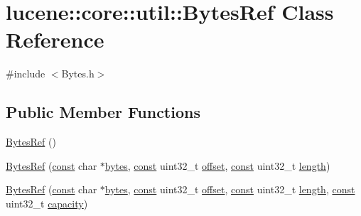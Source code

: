 \hypertarget{classlucene_1_1core_1_1util_1_1BytesRef}{}\section{lucene\+:\+:core\+:\+:util\+:\+:Bytes\+Ref Class Reference}
\label{classlucene_1_1core_1_1util_1_1BytesRef}


{\ttfamily \#include $<$Bytes.\+h$>$}

\subsection*{Public Member Functions}
\begin{DoxyCompactItemize}
\item 
\mbox{\hyperlink{classlucene_1_1core_1_1util_1_1BytesRef_a5c352a399671a6ed5e04cd334149b662}{Bytes\+Ref}} ()
\item 
\mbox{\hyperlink{classlucene_1_1core_1_1util_1_1BytesRef_aafacc8aec4dc0494f42d91876b64bb17}{Bytes\+Ref}} (\mbox{\hyperlink{ZlibCrc32_8h_a2c212835823e3c54a8ab6d95c652660e}{const}} char $\ast$\mbox{\hyperlink{classlucene_1_1core_1_1util_1_1BytesRef_a50b260da81b7f31687ac167ff52c9a1c}{bytes}}, \mbox{\hyperlink{ZlibCrc32_8h_a2c212835823e3c54a8ab6d95c652660e}{const}} uint32\+\_\+t \mbox{\hyperlink{classlucene_1_1core_1_1util_1_1BytesRef_a00b5e81a37602c7af1fde636cd44f12b}{offset}}, \mbox{\hyperlink{ZlibCrc32_8h_a2c212835823e3c54a8ab6d95c652660e}{const}} uint32\+\_\+t \mbox{\hyperlink{classlucene_1_1core_1_1util_1_1BytesRef_a198e62928759942ffc9d2c3ff877b4e4}{length}})
\item 
\mbox{\hyperlink{classlucene_1_1core_1_1util_1_1BytesRef_a3cb2618be430384290cd84c488f8b07d}{Bytes\+Ref}} (\mbox{\hyperlink{ZlibCrc32_8h_a2c212835823e3c54a8ab6d95c652660e}{const}} char $\ast$\mbox{\hyperlink{classlucene_1_1core_1_1util_1_1BytesRef_a50b260da81b7f31687ac167ff52c9a1c}{bytes}}, \mbox{\hyperlink{ZlibCrc32_8h_a2c212835823e3c54a8ab6d95c652660e}{const}} uint32\+\_\+t \mbox{\hyperlink{classlucene_1_1core_1_1util_1_1BytesRef_a00b5e81a37602c7af1fde636cd44f12b}{offset}}, \mbox{\hyperlink{ZlibCrc32_8h_a2c212835823e3c54a8ab6d95c652660e}{const}} uint32\+\_\+t \mbox{\hyperlink{classlucene_1_1core_1_1util_1_1BytesRef_a198e62928759942ffc9d2c3ff877b4e4}{length}}, \mbox{\hyperlink{ZlibCrc32_8h_a2c212835823e3c54a8ab6d95c652660e}{const}} uint32\+\_\+t \mbox{\hyperlink{classlucene_1_1core_1_1util_1_1BytesRef_a9e1775d26ac1dec137aa57fae87f654c}{capacity}})
\item 

\end{DoxyCompactItemize}
